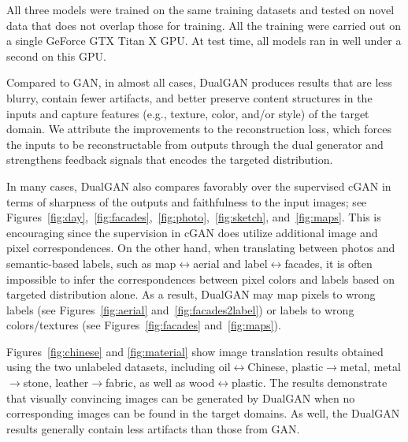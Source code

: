 All three models were trained on the same training datasets and tested on novel data that does not overlap those for training.
All the training were carried out on a single GeForce GTX Titan X GPU. At test time, all models ran in well under a second 
on this GPU. 

Compared to GAN, in almost all cases, DualGAN produces results that are less blurry, contain fewer artifacts, and better
preserve content structures in the inputs and capture features (e.g., texture, color, and/or style) of the target domain. 
We attribute the improvements to the reconstruction loss, which forces the inputs to be reconstructable from 
outputs through the dual generator and strengthens feedback signals that encodes the targeted distribution.  

In many cases, DualGAN also compares favorably over the supervised cGAN in terms of sharpness of the outputs and 
faithfulness to the input images; see Figures~\ref{fig:day},~\ref{fig:facades},~\ref{fig:photo},~\ref{fig:sketch}, and~\ref{fig:maps}.
This is encouraging since the supervision in cGAN does utilize additional image and pixel correspondences. On the other hand, 
when translating between photos and semantic-based labels, such as map$\leftrightarrow$aerial and label$\leftrightarrow$facades, 
it is often impossible to infer the correspondences between pixel colors and labels based on targeted distribution alone. As a result, 
DualGAN may map pixels to wrong labels (see Figures~\ref{fig:aerial} and~\ref{fig:facades2label}) or labels to wrong colors/textures 
(see Figures~\ref{fig:facades} and~\ref{fig:maps}).

Figures~\ref{fig:chinese} and \ref{fig:material} show image translation results obtained using the two unlabeled datasets, including 
oil$\leftrightarrow$Chinese, plastic$\rightarrow$metal, metal$\rightarrow$stone, leather$\rightarrow$fabric, as well as wood$\leftrightarrow$plastic. 
The results demonstrate that visually convincing images can be generated by DualGAN when no corresponding images can be found in 
the target domains. As well, the DualGAN results generally contain less artifacts than those from GAN.




